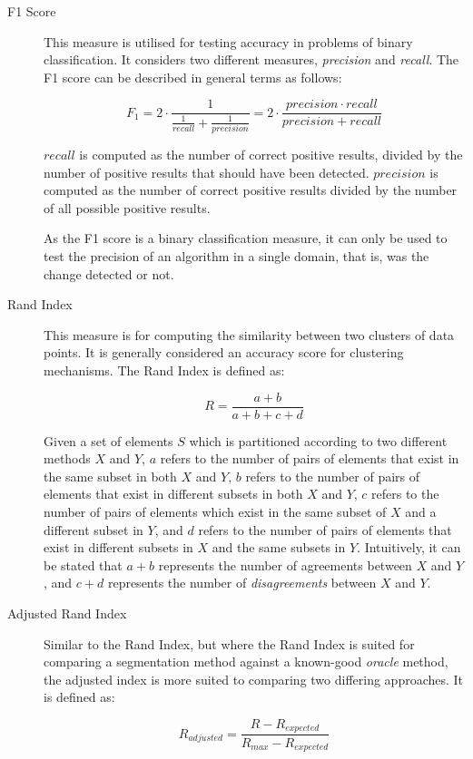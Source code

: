 \documentclass{uvamscse}	%
\begin{document}
\begin{description}
	\item[F1 Score] This measure is utilised for testing accuracy in problems of binary classification. It considers two	different measures, \emph{precision} and \emph{recall}. The F1 score can be described in general terms as follows:

	\begin{equation}
		F_1 = 2 \cdot \frac{1}{\frac{1}{recall} + \frac{1}{precision}} = 2 \cdot \frac{precision \cdot recall}{precision+recall}
		\label{equ:F1}
	\end{equation}

	$recall$ is computed as the number of correct positive results, divided by the number of positive results that should have been detected. $precision$ is computed as the number of correct positive results divided by the number of all possible positive results.

	As the F1 score is a binary classification measure, it can only be used to test the precision of an algorithm in a single domain, that is, was the change detected or not.

	\item[Rand Index] This measure is for computing the similarity between two clusters of data points. It is generally considered an accuracy score for clustering mechanisms. The Rand Index is defined as:

	\begin{equation}
		R = \frac{a+b}{a+b+c+d}
	\end{equation}

	Given a set of elements $S$ which is partitioned according to two different methods $X$ and $Y$, $a$ refers to the number of pairs of elements that exist in the same subset in both $X$ and $Y$, $b$ refers to the number of pairs of elements that exist in different subsets in both $X$ and $Y$, $c$ refers to the number of pairs of elements which exist in the same subset of $X$ and a different subset in $Y$, and $d$ refers to the number of pairs of elements that exist in different subsets in $X$ and the same subsets in $Y$. Intuitively, it can be stated that $a+b$ represents the number of agreements between $X$ and $Y$, and $c+d$ represents the number of \emph{disagreements} between $X$ and $Y$.
	
	\item[Adjusted Rand Index]Similar to the Rand Index, but where the Rand Index is suited for comparing a segmentation method against a known-good \emph{oracle} method, the adjusted index is more suited to comparing two differing approaches. It is defined as:
	
	\begin{equation}
	    R_{adjusted} = \frac{R - R_{expected}}{R_{max} - R_{expected}}
	\end{equation}

\end{description}
\end{document}
